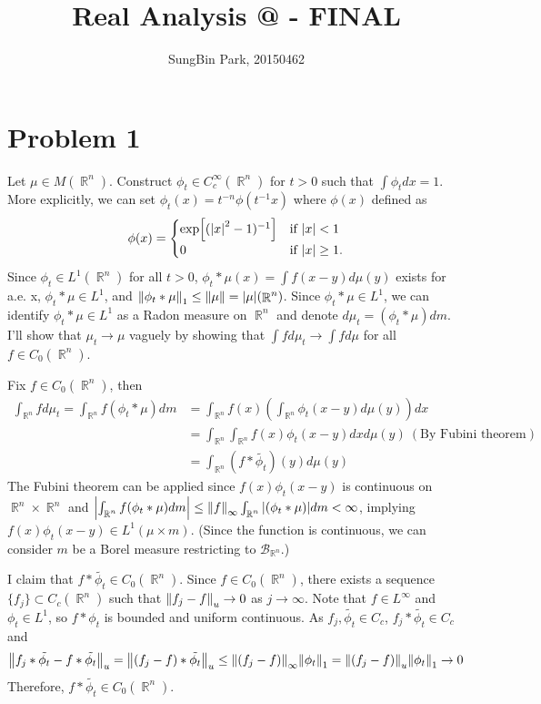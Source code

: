 \documentclass{article}
\makeatletter
\DeclareMathOperator{\rr}{\mathbb{R}}
\newcommand*{\rom}[1]{\expandafter\@slowromancap\romannumeral #1@}
\makeatother
\begin{document}
\title{Real Analysis \rom{2} - FINAL}
\author{SungBin Park, 20150462} 

\maketitle

\section*{Problem 1}
Let $\mu\in M(\rr^n)$. Construct $\phi_t\in C_c^\infty(\rr^n)$ for $t>0$ such that $\int \phi_t dx=1$. More explicitly, we can set $\phi_t(x)=t^{-n}\phi(t^{-1}x)$ where $\phi(x)$ defined as
\begin{equation*}
\phi(x)=\begin{cases}
\exp[(\abs{x}^2-1)^{-1}] & \text{if }\abs{x}<1 \\
0 & \text{if }\abs{x}\geq 1.
\end{cases}
\end{equation*}
Since $\phi_t\in L^1(\rr^n)$ for all $t>0$, $\phi_t*\mu(x)=\int f(x-y)d\mu(y)$ exists for a.e. x, $\phi_t*\mu\in L^1$, and $\norm{\phi_t * \mu}_1\leq \norm{\mu}=\abs{\mu}(\rr^n)$. Since $\phi_t*\mu\in L^1$, we can identify $\phi_t*\mu\in L^1$ as a Radon measure on $\rr^n$ and denote $d\mu_t=(\phi_t*\mu)dm$. I'll show that $\mu_t\rightarrow\mu$ vaguely by showing that $\int fd\mu_t\rightarrow\int fd\mu$ for all $f\in C_0(\rr^n)$.

Fix $f\in C_0(\rr^n)$, then
\begin{equation*}
\begin{split}
\int_{\rr^n} fd\mu_t = \int_{\rr^n} f (\phi_t*\mu)dm&=\int_{\rr^n} f(x) \left(\int_{\rr^n} \phi_t(x-y)d\mu(y)\right)dx \\
&=\int_{\rr^n}\int_{\rr^n} f(x)\phi_t(x-y)dxd\mu(y)~(\text{By Fubini theorem}) \\
&=\int_{\rr^n} (f*\tilde{\phi_t})(y)d\mu(y)
\end{split}
\end{equation*}
The Fubini theorem can be applied since $f(x)\phi_t(x-y)$ is continuous on $\rr^n\times \rr^n$ and $\abs{\int_{\rr^n} f (\phi_t*\mu)dm}\leq \norm{f}_\infty \int_{\rr^n}\abs{(\phi_t*\mu)}dm<\infty$, implying $f(x)\phi_t(x-y)\in L^1(\mu\times m)$. (Since the function is continuous, we can consider $m$ be a Borel measure restricting to $\mathcal{B}_{\rr^n}$.)

I claim that $f*\tilde{\phi_t}\in C_0(\rr^n)$. Since $f\in C_0(\rr^n)$, there exists a sequence $\{f_j\}\subset C_c(\rr^n)$ such that $\norm{f_j-f}_u\rightarrow 0$ as $j\rightarrow \infty$. Note that $f\in L^\infty$ and $\phi_t\in L^1$, so $f*\phi_t$ is bounded and uniform continuous. As $f_j,\tilde{\phi_t}\in C_c$, $f_j*\tilde{\phi_t}\in C_c$ and
\begin{equation*}
\norm{f_j*\tilde{\phi_t}-f*\tilde{\phi_t}}_u=\norm{(f_j-f)*\tilde{\phi_t}}_u\leq \norm{(f_j-f)}_\infty\norm{\phi_t}_1=\norm{(f_j-f)}_u\norm{\phi_t}_1\rightarrow 0
\end{equation*}
Therefore, $f*\tilde{\phi_t}\in C_0(\rr^n)$.
\end{document}

